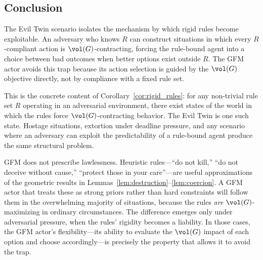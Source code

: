 \subsection{Conclusion}

The Evil Twin scenario isolates the mechanism by which rigid rules become exploitable. An adversary who knows $R$ can construct situations in which every $R$-compliant action is $\vol(G)$-contracting, forcing the rule-bound agent into a choice between bad outcomes when better options exist outside $R$. The GFM actor avoids this trap because its action selection is guided by the $\vol(G)$ objective directly, not by compliance with a fixed rule set.

This is the concrete content of Corollary~\ref{cor:rigid_rules}: for any non-trivial rule set $R$ operating in an adversarial environment, there exist states of the world in which the rules force $\vol(G)$-contracting behavior. The Evil Twin is one such state. Hostage situations, extortion under deadline pressure, and any scenario where an adversary can exploit the predictability of a rule-bound agent produce the same structural problem.

GFM does not prescribe lawlessness. Heuristic rules---``do not kill,'' ``do not deceive without cause,'' ``protect those in your care''---are useful approximations of the geometric results in Lemmas~\ref{lem:destruction}--\ref{lem:coercion}. A GFM actor that treats these as strong priors rather than hard constraints will follow them in the overwhelming majority of situations, because the rules \emph{are} $\vol(G)$-maximizing in ordinary circumstances. The difference emerges only under adversarial pressure, when the rules' rigidity becomes a liability. In those cases, the GFM actor's flexibility---its ability to evaluate the $\vol(G)$ impact of each option and choose accordingly---is precisely the property that allows it to avoid the trap.
